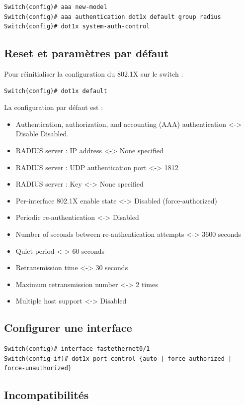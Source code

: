 \begin{verbatim}
Switch(config)# aaa new-model
Switch(config)# aaa authentication dot1x default group radius
Switch(config)# dot1x system-auth-control
\end{verbatim}

\subsection{Reset et paramètres par défaut}

Pour réinitialiser la configuration du 802.1X sur le switch :

\begin{verbatim}
Switch(config)# dot1x default
\end{verbatim}

La configuration par défaut est :
\begin{itemize}
\item Authentication, authorization, and accounting (AAA) authentication <-> Disable
Disabled. 
\item RADIUS server : IP address <-> None specified
\item RADIUS server : UDP authentication port <-> 1812
\item RADIUS server : Key <-> None specified
\item Per-interface 802.1X enable state <-> Disabled (force-authorized)
\item Periodic re-authentication <-> Disabled
\item Number of seconds between re-authentication attempts <-> 3600 seconds
\item Quiet period <-> 60 seconds
\item Retransmission time <-> 30 seconds
\item Maximum retransmission number <-> 2 times
\item Multiple host support <-> Disabled
\end{itemize}

\subsection{Configurer une interface}

\begin{verbatim}
Switch(config)# interface fastethernet0/1
Switch(config-if)# dot1x port-control {auto | force-authorized | force-unauthorized}
\end{verbatim}

\subsection{Incompatibilités}

